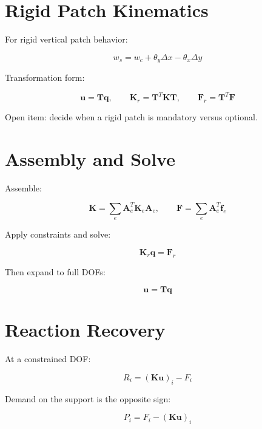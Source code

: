 \documentclass[10pt]{article}
\begin{document}
\section{Rigid Patch Kinematics}

For rigid vertical patch behavior:

\begin{equation}
w_s = w_c + \theta_y \Delta x - \theta_x \Delta y
\end{equation}

Transformation form:

\begin{equation}
\mathbf u = \mathbf T\mathbf q,\qquad
\mathbf K_r = \mathbf T^T\mathbf K\mathbf T,\qquad
\mathbf F_r = \mathbf T^T\mathbf F
\end{equation}

Open item: decide when a rigid patch is mandatory versus optional.

\section{Assembly and Solve}

Assemble:

\begin{equation}
\mathbf K = \sum_e \mathbf A_e^T\mathbf K_e\mathbf A_e,\qquad
\mathbf F = \sum_e \mathbf A_e^T\mathbf f_e
\end{equation}

Apply constraints and solve:

\begin{equation}
\mathbf K_r\mathbf q = \mathbf F_r
\end{equation}

Then expand to full DOFs:

\begin{equation}
\mathbf u = \mathbf T\mathbf q
\end{equation}

\section{Reaction Recovery}

At a constrained DOF:

\begin{equation}
R_i = (\mathbf K\mathbf u)_i - F_i
\end{equation}

Demand on the support is the opposite sign:

\begin{equation}
P_i = F_i - (\mathbf K\mathbf u)_i
\end{equation}
\end{document}
